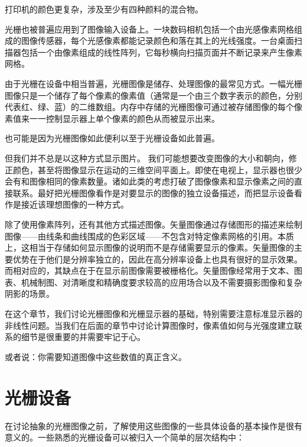 \documentclass[lang=cn,12pt]{elegantbook}
\begin{document}
\begin{note}
  打印机的颜色更复杂，涉及至少有四种颜料的混合物。
\end{note}

光栅也被普遍应用到了图像输入设备上。一块数码相机包括一个由光感像素网格组成的图像传感器，每个光感像素都能记录颜色和落在其上的光线强度。一台桌面扫描器包括一个由像素组成的线性阵列，它每秒横向扫描页面并不断记录来产生像素网格。

由于光栅在设备中相当普遍，光栅图像是储存、处理图像的最常见方式。一幅光栅图像只是一个储存了每个像素的像素值（通常是一个由三个数字表示的颜色，分别代表红、绿、蓝）的二维数组。内存中存储的光栅图像可通过被存储图像的每个像素值来一一控制显示器上单个像素的颜色从而被显示出来。

\begin{note}
  也可能是因为光栅图像如此便利以至于光栅设备如此普遍。
\end{note}

但我们并不总是以这种方式显示图片。 我们可能想要改变图像的大小和朝向，修正颜色，甚至将图像显示在运动的三维空间平面上。即使在电视上，显示器也很少会有和图像相同的像素数量。诸如此类的考虑打破了图像像素和显示像素之间的直接联系。最好把光栅图像看作是对要显示的图像的独立设备描述，而把显示设备看作是接近该理想图像的一种方式。

除了使用像素阵列，还有其他方式描述图像。矢量图像通过存储图形的描述来绘制图像——由线条和曲线围成的色彩区域——不包含对特定像素网格的引用。本质上，这相当于存储如何显示图像的说明而不是存储需要显示的像素。矢量图像的主要优势在于他们是分辨率独立的，因此在高分辨率设备上也具有很好的显示效果。而相对应的，其缺点在于在显示前图像需要被栅格化。矢量图像经常用于文本、图表、机械制图、对清晰度和精确度要求较高的应用场合以及不需要摄影图像和复杂阴影的场景。

在这个章节，我们讨论光栅图像和光栅显示器的基础，特别需要注意标准显示器的非线性问题。当我们在后面的章节中讨论计算图像时，像素值如何与光强度建立联系的细节是很重要的并需要牢记于心。

\begin{note}
  或者说：你需要知道图像中这些数值的真正含义。
\end{note}

\section{光栅设备}

在讨论抽象的光栅图像之前，了解使用这些图像的一些具体设备的基本操作是很有意义的。一些熟悉的光栅设备可以被归入一个简单的层次结构中：
\end{document}

